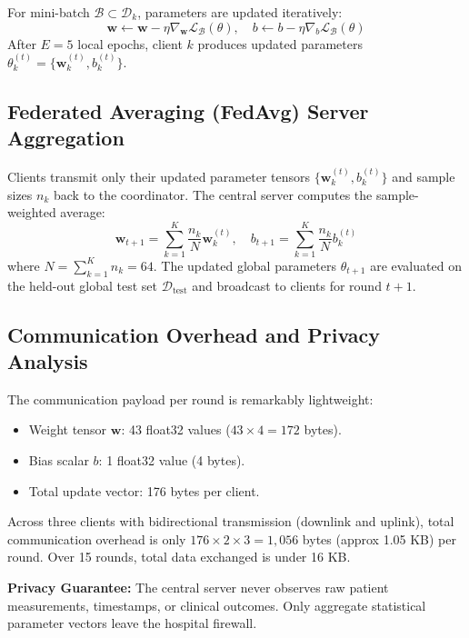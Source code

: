 \documentclass[12pt,a4paper,oneside]{report}
\begin{document}
For mini-batch $\mathcal{B} \subset \mathcal{D}_k$, parameters are updated iteratively:
\begin{equation}
\mathbf{w} \leftarrow \mathbf{w} - \eta \nabla_{\mathbf{w}} \mathcal{L}_{\mathcal{B}}(\theta), \quad b \leftarrow b - \eta \nabla_{b} \mathcal{L}_{\mathcal{B}}(\theta)
\end{equation}
After $E = 5$ local epochs, client $k$ produces updated parameters $\theta_k^{(t)} = \{\mathbf{w}_k^{(t)}, b_k^{(t)}\}$.

\subsection{Federated Averaging (FedAvg) Server Aggregation}
\label{subsec:server_aggregation}

Clients transmit only their updated parameter tensors $\{\mathbf{w}_k^{(t)}, b_k^{(t)}\}$ and sample sizes $n_k$ back to the coordinator. The central server computes the sample-weighted average:
\begin{equation}
\label{eq:fedavg_weights}
\mathbf{w}_{t+1} = \sum_{k=1}^K \frac{n_k}{N} \mathbf{w}_k^{(t)}, \quad b_{t+1} = \sum_{k=1}^K \frac{n_k}{N} b_k^{(t)}
\end{equation}
where $N = \sum_{k=1}^K n_k = 64$. The updated global parameters $\theta_{t+1}$ are evaluated on the held-out global test set $\mathcal{D}_{\text{test}}$ and broadcast to clients for round $t+1$.

\subsection{Communication Overhead and Privacy Analysis}
\label{subsec:comm_privacy}

The communication payload per round is remarkably lightweight:
\begin{itemize}
    \item Weight tensor $\mathbf{w}$: 43 float32 values ($43 \times 4 = 172$ bytes).
    \item Bias scalar $b$: 1 float32 value (4 bytes).
    \item Total update vector: 176 bytes per client.
\end{itemize}
Across three clients with bidirectional transmission (downlink and uplink), total communication overhead is only $176 \times 2 \times 3 = 1,056$ bytes (approx 1.05 KB) per round. Over 15 rounds, total data exchanged is under 16 KB. 

\textbf{Privacy Guarantee:} The central server never observes raw patient measurements, timestamps, or clinical outcomes. Only aggregate statistical parameter vectors leave the hospital firewall.
\end{document}
